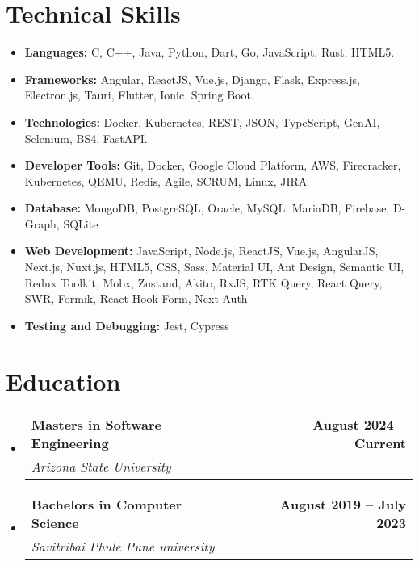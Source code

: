 \documentclass[letterpaper,11pt]{article}
\makeatletter
\newcommand{\resumeItem}[1]{
  \item\small{
    {#1 \vspace{-2pt}}
  }
}
\newcommand{\resumeSubheading}[4]{
  \vspace{-2pt}\item
    \begin{tabular*}{0.97\textwidth}[t]{l@{\extracolsep{\fill}}r}
      \textbf{\small#1} & \textbf{\small#2} \\
      \textit{\small#3} & \textit{\small#4} \\
    \end{tabular*}\vspace{-7pt}
}
\newcommand{\resumeSubItem}[1]{\resumeItem{#1}\vspace{-4pt}}
\newcommand{\resumeSubHeadingListStart}{\begin{itemize}[leftmargin=0.15in, label={}]}
\newcommand{\resumeSubHeadingListEnd}{\end{itemize}}
\makeatother
\begin{document}
\section{Technical Skills}
\resumeSubHeadingListStart
  \resumeSubItem{\textbf{Languages:} C, C++, Java, Python, Dart, Go, JavaScript, Rust, HTML5.}
  \resumeSubItem{\textbf{Frameworks:} Angular, ReactJS, Vue.js, Django, Flask, Express.js, Electron.js, Tauri, Flutter, Ionic, Spring Boot.}
  \resumeSubItem{\textbf{Technologies:} Docker, Kubernetes, REST, JSON, TypeScript, GenAI, Selenium, BS4, FastAPI.}
  \resumeSubItem{\textbf{Developer Tools:} Git, Docker, Google Cloud Platform, AWS, Firecracker, Kubernetes, QEMU, Redis, Agile, SCRUM, Linux, JIRA}
  \resumeSubItem{\textbf{Database:} MongoDB, PostgreSQL, Oracle, MySQL, MariaDB, Firebase, D-Graph, SQLite}
  \resumeSubItem{\textbf{Web Development:} JavaScript, Node.js, ReactJS, Vue.js, AngularJS, Next.js, Nuxt.js, HTML5, CSS, Sass, Material UI, Ant Design, Semantic UI, Redux Toolkit, Mobx, Zustand, Akito, RxJS, RTK Query, React Query, SWR, Formik, React Hook Form, Next Auth}
  \resumeSubItem{\textbf{Testing and Debugging:} Jest, Cypress}
\resumeSubHeadingListEnd

\section{Education}
  \resumeSubHeadingListStart
    \resumeSubheading
      {Masters in Software Engineering}{August 2024 -- Current}
      {Arizona State University}{}
    \resumeSubheading
      {Bachelors in Computer Science}{August 2019 -- July 2023}
      {Savitribai Phule Pune university}{}
  \resumeSubHeadingListEnd
\end{document}
